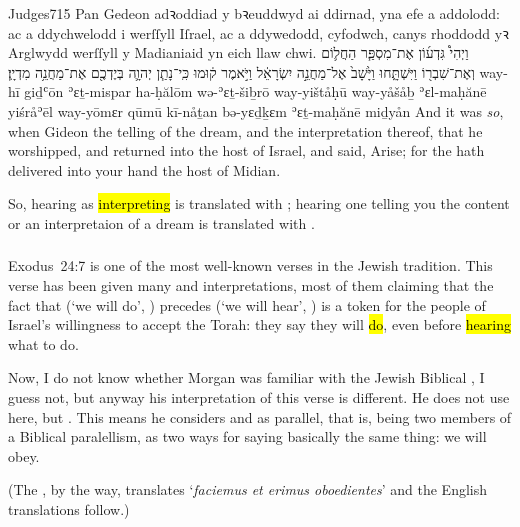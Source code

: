 \begin{example}{Judges}{7}{15}{}{}
	\quoling
	{Pan  Gedeon adꝛoddiad y bꝛeuddwyd ai ddirnad, yna efe a addolodd: ac a ddychwelodd i werſſyll Iſrael, ac a ddywedodd, cyfodwch, canys rhoddodd yꝛ Arglwydd werſſyll y Madianiaid yn eich llaw chwi.}
	{וַיְהִי֩  גִּדְע֜וֹן אֶת־מִסְפַּ֧ר הַחֲל֛וֹם וְאֶת־שִׁבְר֖וֹ וַיִּשְׁתָּ֑חוּ וַיָּ֙שָׁב֙ אֶל־מַחֲנֵ֣ה יִשְׂרָאֵ֔ל וַיֹּ֣אמֶר ק֔וּמוּ כִּֽי־נָתַ֧ן יְהוָ֛ה בְּיֶדְכֶ֖ם אֶת־מַחֲנֵ֥ה מִדְיָֽן׃}
	{way-hī  giḏʿōn ʾɛṯ-mispar ha-ḥălōm wə-ʾɛṯ-šiḇrō way-yištåḥū way-yåšåḇ ʾɛl-maḥănē yiśråʾēl way-yōmɛr qūmū kī-nåṯan {\YHWH} bə-yɛḏḵɛm ʾɛṯ-maḥănē miḏyån}
	{And it was \textit{so}, when Gideon  the telling of the dream, and the interpretation thereof, that he worshipped, and returned into the host of Israel, and said, Arise; for the {\LORD} hath delivered into your hand the host of Midian.}
\end{example}

\begin{paper}
	So, hearing as \hl{interpreting} is translated with ; hearing one telling you the content or an interpretaion of a dream is translated with .
\end{paper}

\subsubsection{}

\begin{paper}
	{\click} Exodus~24:7 is one of the most well-known verses in the Jewish tradition. This verse has been given many  and interpretations, most of them claiming that the fact that  (‘we will do’, ) precedes  (‘we will hear’, ) is a token for the people of Israel's willingness to accept the Torah: they say they will \hl{do}, even before \hl{hearing} what to do.

	Now, I do not know whether Morgan was familiar with the Jewish Biblical , I guess not, but anyway his interpretation of this verse is different. He does not use  here, but . This means he considers  and  as parallel, that is, being two members of a Biblical paralellism, as two ways for saying basically the same thing: we will obey.

	(The , by the way, translates ‘\textit{faciemus et erimus oboedientes}’ and the English translations follow.)
\end{paper}


